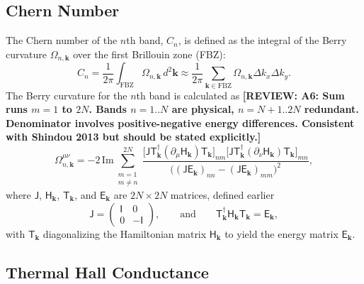 \documentclass[aps, prx, nofootinbib, superscriptaddress]{revtex4-2}
\newcommand{\REVIEW}[1]{{\color{reviewcolor}\bfseries [REVIEW: #1]}}
\newcommand{\kvec}{\mathbf{k}}
\begin{document}
\subsection{Chern Number}\label{subsec: Chern number}

The Chern number of the $n$th band, $C_n$, is defined as the integral of the Berry curvature $\Omega_{n, \kvec}$ over the first Brillouin zone (FBZ):
\begin{equation}
    C_n = \frac{1}{2\pi} \int_{\text{FBZ}} \Omega_{n, \kvec} \, d^2\mathbf{k} 
    \approx \frac{1}{2\pi} \sum_{\kvec \in \text{FBZ}} \Omega_{n, \kvec} \Delta k_x \Delta k_y.
\end{equation}
The Berry curvature for the $n$th band is calculated as
\REVIEW{A6: Sum runs $m=1$ to $2N$. Bands $n=1..N$ are physical, $n=N+1..2N$ redundant. Denominator involves positive-negative energy differences. Consistent with Shindou 2013 but should be stated explicitly.}
\begin{equation}
    \Omega_{n, \kvec}^{\mu\nu} =
    - 2 \, \mathrm{Im} \sum_{\substack{m = 1 \\ m \neq n}}^{2N}
    \frac{
        \big[ \mathsf{J} \mathsf{T}^{\dagger}_{\kvec} (\partial_{\mu} \mathsf{H}_{\kvec}) \mathsf{T}_{\kvec} \big]_{nm}
        \big[ \mathsf{J} \mathsf{T}^{\dagger}_{\kvec} (\partial_{\nu} \mathsf{H}_{\kvec}) \mathsf{T}_{\kvec} \big]_{mn}
    }{\big( (\mathsf{J} \mathsf{E}_{\kvec})_{nn} - (\mathsf{J} \mathsf{E}_{\kvec})_{mm} \big)^2},
\end{equation}
where $\mathsf{J}$, $\mathsf{H}_{\kvec}$, $\mathsf{T}_{\kvec}$, and $\mathsf{E}_{\kvec}$ are $2N \times 2N$ matrices, defined earlier
\begin{equation}
    \mathsf{J} = 
    \begin{pmatrix}
        \mathsf{I} & 0 \\ 0 & -\mathsf{I}
    \end{pmatrix}, 
    \qquad \text{and} \qquad
    \mathsf{T}^{\dagger}_{\kvec} \mathsf{H}_{\kvec} \mathsf{T}_{\kvec} = \mathsf{E}_{\kvec},
\end{equation}
with $\mathsf{T}_{\kvec}$ diagonalizing the Hamiltonian matrix $\mathsf{H}_{\kvec}$ to yield the energy matrix $\mathsf{E}_{\kvec}$.




\subsection{Thermal Hall Conductance}\label{subsec: Thermal Hall Conductance}
\end{document}
